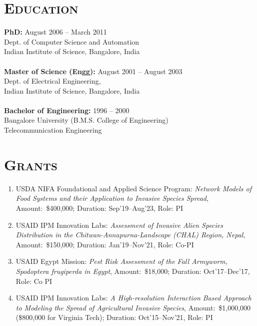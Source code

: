 \documentclass[margin,10pt]{res}
\begin{document}
\begin{resume}
\section{\textnormal{\textsc{Education}}}
\textbf{PhD:} \hfill August 2006 -- March 2011\\
Dept. of Computer Science and Automation\\
Indian Institute of Science, Bangalore, India\\ 
~\\
\noindent\textbf{Master of Science (Engg):} \hfill August 2001 -- August 2003\\
Dept. of Electrical Engineering,\\
Indian Institute of Science, Bangalore, India\\
~\\
\noindent\textbf{Bachelor of Engineering:} \hfill 1996 -- 2000\\
Bangalore University (B.M.S. College of Engineering)\\
Telecommunication Engineering

\section{\textnormal{\textsc{Grants}}}
\begin{enumerate}[$\circ$]
\item USDA NIFA Foundational and Applied Science Program: \emph{Network
Models of Food Systems and their Application to Invasive Species Spread},
Amount:~\$400,000; Duration: Sep'19--Aug'23,
Role: PI
\item USAID IPM Innovation Labs: \emph{Assessment of Invasive Alien Species
Distribution in the Chitwan-Annapurna-Landscape (CHAL) Region, Nepal},
Amount:~\$150,000; Duration: Jan'19--Nov'21,
Role: Co-PI
\item USAID Egypt Mission: \emph{Pest Risk Assessment of the Fall Armyworm,
Spodoptera frugiperda in Egypt}, Amount:~\$18,000; Duration:
Oct'17--Dec'17, Role: Co PI
\item USAID IPM Innovation Labs: \emph{A High-resolution Interaction Based Approach to Modeling the Spread of Agricultural Invasive Species},
Amount:~\$1,000,000 (\$800,000 for Virginia Tech); Duration:
Oct'15--Nov'21,
Role: PI
\end{enumerate}


\end{resume}
\end{document}

